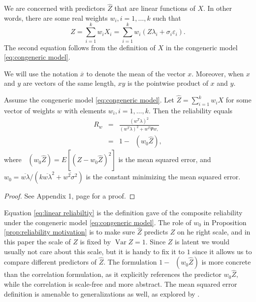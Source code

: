 \documentclass[twoside]{article}
\DeclareMathOperator{\Var}{Var}
\DeclareMathOperator{\MSE}{MSE_Z}
\begin{document}
We are concerned with predictors $\hat{Z}$ that are linear functions of $X$. In other words, there are some real weights $w_{i},i=1,\ldots,k$ such that
\begin{equation}
\label{eq:Linear predictor}
\hat{Z} =  \sum_{i=1}^{k} w_{i}X_i = \sum_{i=1}^{k}w_{i}(Z\lambda_i + \sigma_{i} \varepsilon_i).\nonumber 
\end{equation}
The second equation follows from the definition of $X$ in the congeneric model \eqref{eq:congeneric model}. 

We will use the notation $\overline{x}$ to denote the mean of the vector $x$. Moreover, when $x$ and $y$ are vectors of the same length, $xy$ is the pointwise product of $x$ and $y$.

\begin{prop}
\label{prop:reliability motivation}Assume the congeneric model \eqref{eq:congeneric model}. Let $\hat{Z}=\sum_{i=1}^{k}w_{i}X$
for some vector of weights $w$ with elements $w_{i},i=1,\ldots,k$. Then the reliability equals
\begin{eqnarray}
 R_w & = & \frac{(w^{T}\lambda)^{2}}{(w^{T}\lambda)^{2}+w^{T}\Psi w,}\label{eq:linear reliabiltiy}\\
 & = & 1- \MSE (w_{0}\hat{Z}),\label{eq:MSE}
\end{eqnarray}
where $\MSE (w_{0}\hat{Z})=E[(Z-w_{0}\hat{Z})^{2}]$ is the
mean squared error, and $w_{0}=\overline{w\lambda}/(k\overline{w\lambda}^{2}+\overline{w^{2}\sigma^{2}})$ is the constant minimizing the mean squared error.
\end{prop}
\begin{proof}
See Appendix 1, page \pageref{proof:reliability motivation} for a proof.
\end{proof}

Equation \eqref{eq:linear reliabiltiy} is the definition \citet[][p. 112]{Joreskog1971-nn} gave of the composite reliability under the congeneric model \eqref{eq:congeneric model}. 
The role of $w_0$ in Proposition \ref{prop:reliability motivation} is to make sure $\hat{Z}$ predicts $Z$ on he right scale, and in this paper the scale of $Z$ is fixed by $\Var Z = 1$. Since $Z$ is latent we would usually not care about this scale, but it is handy to fix it to $1$ since it allows us to compare different predictors of $\hat{Z}$. The formulation $1-\MSE (w_{0}\hat{Z})$ is more concrete than the correlation formulation, as it explicitly references the predictor $w_{0}\hat{Z}$, while the correlation is scale-free and more abstract. The mean squared error definition is amenable to generalizations as well, as explored by \citet{Korn1991-lw}.
\end{document}
